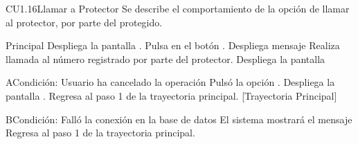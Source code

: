 \begin{UseCase}{CU1.16}{Llamar a Protector}{
	Se describe el comportamiento de la opción de llamar al protector, por parte del protegido.}
	\end{UseCase}

	
	\begin{UCtrayectoria}{Principal}
		\UCpaso[\UCsist] Despliega la pantalla .
		\UCpaso[\UCactor] Pulsa en el botón .
		\UCpaso[\UCsist] Despliega mensaje  
		\UCpaso[\UCsist] Realiza llamada al número registrado por parte del protector. 
		\UCpaso[\UCsist] Despliega la pantalla  
	\end{UCtrayectoria}


	\begin{UCtrayectoriaA}{A}{Condición: Usuario ha cancelado la operación}
		\UCpaso[\UCactor] Pulsó la opción .
		\UCpaso[\UCsist] Despliega la pantalla .
		\UCpaso[\UCsist] Regresa al paso 1 de la trayectoria principal. [Trayectoria Principal]
	\end{UCtrayectoriaA}

	\begin{UCtrayectoriaA}{B}{Condición: Falló la conexión en la base de datos}
		\UCpaso[\UCsist] El sistema mostrará el mensaje 
		\UCpaso[\UCsist] Regresa al paso 1 de la trayectoria principal. 
	\end{UCtrayectoriaA}

	